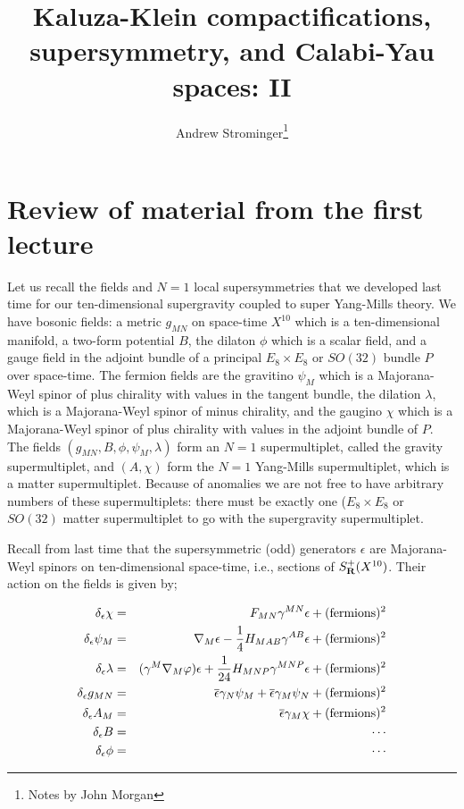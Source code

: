 \title{Kaluza-Klein compactifications, supersymmetry, and Calabi-Yau
spaces: II}  
\author{Andrew Strominger\thanks{Notes by John Morgan}}
\date{}

\maketitle

\addtocounter{section}{4}

\section{Review of material from the first lecture}

Let  us recall the fields and $N=1$
local supersymmetries that we 
developed last time for our ten-dimensional supergravity 
coupled to super Yang-Mills theory.
We have bosonic fields: a metric $g_{MN}$  on space-time $X^{10}$
which is a ten-dimensional manifold, a two-form potential
$B$, the dilaton $\phi$ which is a scalar field, and 
a gauge field in the adjoint bundle of a principal $E_8\times E_8$ or
$SO(32)$ bundle $P$ over space-time.
The fermion fields are the gravitino $\psi_M$ which is a Majorana-Weyl
spinor of plus chirality with values in the tangent bundle, the
dilation $\lambda$, which is a Majorana-Weyl spinor of minus
chirality, and the gaugino $\chi$ which is a Majorana-Weyl spinor of
plus chirality with values in the adjoint bundle of $P$. 
The fields $(g_{MN},B,\phi,\psi_M,\lambda)$ form an $N=1$ supermultiplet,
called the gravity supermultiplet, and $(A,\chi)$ form the $N=1$
Yang-Mills supermultiplet, which is a matter supermultiplet.
Because of anomalies we are not free to have arbitrary numbers of
these supermultiplets: there must be exactly one ($E_8\times E_8$ or
$SO(32)$ matter supermultiplet
to go with the supergravity supermultiplet.



Recall from last time that the supersymmetric (odd)
generators $\epsilon$ are Majorana-Weyl spinors on
ten-dimensional space-time, i.e., sections of $S^+_{\bf R}(X^{10})$.
Their action on the fields  is given by; 

\begin{eqnarray*}
\delta_\epsilon\chi & = & F_{MN}\gamma^{MN}\epsilon+({\rm fermions})^2 \\
\delta_\epsilon\psi_M  &  =  &  \nabla_M\epsilon -\frac{1}{4}
H_{MAB}\gamma^{AB}\epsilon +({\rm fermions})^2 \\
\delta_\epsilon\lambda  &  =  &  (\gamma^M\nabla_M\varphi)\epsilon
+\frac{1}{24}H_{MNP}\gamma^{MNP}\epsilon +({\rm fermions})^2 \\
\delta_\epsilon g_{MN}  &  =  &  \overline\epsilon
\gamma_N\psi_M+\overline\epsilon\gamma_M \psi_N+({\rm fermions})^2 \\
\delta_\epsilon A_M  &  =  &  \overline\epsilon \gamma_M\chi +({\rm
fermions})^2 \\
\delta_\epsilon B & = &  \cdots \\
\delta_\epsilon \phi & = & \cdots 
\end{eqnarray*}



